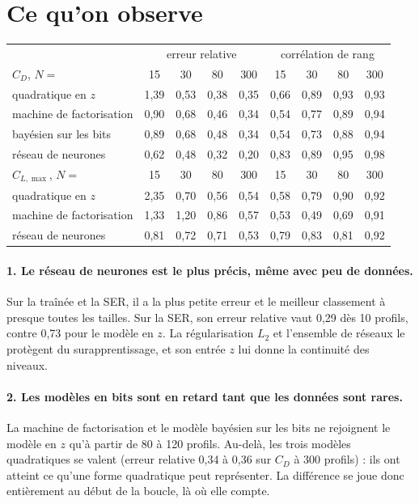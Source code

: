 \section{Ce qu'on observe}
\begin{center}
\renewcommand{\arraystretch}{1.2}
\small
\begin{tabular}{l cccc cccc}
\toprule
& \multicolumn{4}{c}{erreur relative} & \multicolumn{4}{c}{corrélation de rang} \\
$C_D$, $N=$ & 15 & 30 & 80 & 300 & 15 & 30 & 80 & 300 \\
\midrule
quadratique en $z$ & 1,39 & 0,53 & 0,38 & 0,35 & 0,66 & 0,89 & 0,93 & 0,93 \\
machine de factorisation & 0,90 & 0,68 & 0,46 & 0,34 & 0,54 & 0,77 & 0,89 & 0,94 \\
bayésien sur les bits & 0,89 & 0,68 & 0,48 & 0,34 & 0,54 & 0,73 & 0,88 & 0,94 \\
réseau de neurones & 0,62 & 0,48 & 0,32 & 0,20 & 0,83 & 0,89 & 0,95 & 0,98 \\
\midrule
$C_{L,\max}$, $N=$ & 15 & 30 & 80 & 300 & 15 & 30 & 80 & 300 \\
\midrule
quadratique en $z$ & 2,35 & 0,70 & 0,56 & 0,54 & 0,58 & 0,79 & 0,90 & 0,92 \\
machine de factorisation & 1,33 & 1,20 & 0,86 & 0,57 & 0,53 & 0,49 & 0,69 & 0,91 \\
réseau de neurones & 0,81 & 0,72 & 0,71 & 0,53 & 0,79 & 0,83 & 0,81 & 0,92 \\
\bottomrule
\end{tabular}
\end{center}

\paragraph{1. Le réseau de neurones est le plus précis, même avec peu de données.} Sur la traînée et la SER, il a la plus petite erreur et le meilleur classement à presque toutes les tailles. Sur la SER, son erreur relative vaut 0,29 dès 10 profils, contre 0,73 pour le modèle en $z$. La régularisation $L_2$ et l'ensemble de réseaux le protègent du surapprentissage, et son entrée $z$ lui donne la continuité des niveaux.

\paragraph{2. Les modèles en bits sont en retard tant que les données sont rares.} La machine de factorisation et le modèle bayésien sur les bits ne rejoignent le modèle en $z$ qu'à partir de 80 à 120 profils. Au-delà, les trois modèles quadratiques se valent (erreur relative 0,34 à 0,36 sur $C_D$ à 300 profils) : ils ont atteint ce qu'une forme quadratique peut représenter. La différence se joue donc entièrement au début de la boucle, là où elle compte.


